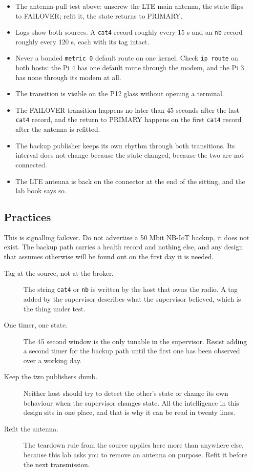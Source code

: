 \begin{itemize}
\item The antenna-pull test above: unscrew the LTE main antenna, the state flips to FAILOVER; refit it, the state returns to PRIMARY.
\item Logs show both sources. A \texttt{cat4} record roughly every 15 s and an \texttt{nb} record roughly every 120 s, each with its tag intact.
\item Never a bonded \texttt{metric 0} default route on one kernel. Check \texttt{ip route} on both hosts: the Pi 4 has one default route through the modem, and the Pi 3 has none through its modem at all.
\item The transition is visible on the P12 glass without opening a terminal.
\item The FAILOVER transition happens no later than 45 seconds after the last \texttt{cat4} record, and the return to PRIMARY happens on the first \texttt{cat4} record after the antenna is refitted.
\item The backup publisher keeps its own rhythm through both transitions. Its interval does not change because the state changed, because the two are not connected.
\item The LTE antenna is back on the connector at the end of the sitting, and the lab book says so.
\end{itemize}

\subsection*{Practices}

This is signalling failover. Do not advertise a 50 Mbit NB-IoT backup, it does not exist. The backup path carries a health record and nothing else, and any design that assumes otherwise will be found out on the first day it is needed.

\begin{description}
\item[Tag at the source, not at the broker.] The string \texttt{cat4} or \texttt{nb} is written by the host that owns the radio. A tag added by the supervisor describes what the supervisor believed, which is the thing under test.
\item[One timer, one state.] The 45 second window is the only tunable in the supervisor. Resist adding a second timer for the backup path until the first one has been observed over a working day.
\item[Keep the two publishers dumb.] Neither host should try to detect the other's state or change its own behaviour when the supervisor changes state. All the intelligence in this design sits in one place, and that is why it can be read in twenty lines.
\item[Refit the antenna.] The teardown rule from the source applies here more than anywhere else, because this lab asks you to remove an antenna on purpose. Refit it before the next transmission.
\end{description}

